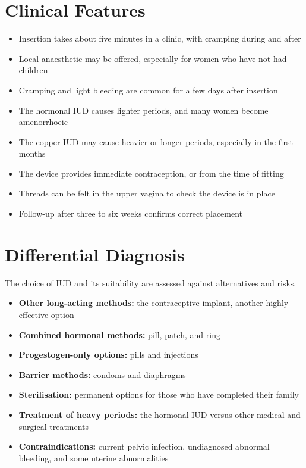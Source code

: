 \section*{Clinical Features}
\begin{itemize}
    \item Insertion takes about five minutes in a clinic, with cramping during and after
    \item Local anaesthetic may be offered, especially for women who have not had children
    \item Cramping and light bleeding are common for a few days after insertion
    \item The hormonal IUD causes lighter periods, and many women become amenorrhoeic
    \item The copper IUD may cause heavier or longer periods, especially in the first months
    \item The device provides immediate contraception, or from the time of fitting
    \item Threads can be felt in the upper vagina to check the device is in place
    \item Follow-up after three to six weeks confirms correct placement
\end{itemize}

\section*{Differential Diagnosis}
The choice of IUD and its suitability are assessed against alternatives and risks.
\begin{itemize}
    \item \textbf{Other long-acting methods:} the contraceptive implant, another highly effective option
    \item \textbf{Combined hormonal methods:} pill, patch, and ring
    \item \textbf{Progestogen-only options:} pills and injections
    \item \textbf{Barrier methods:} condoms and diaphragms
    \item \textbf{Sterilisation:} permanent options for those who have completed their family
    \item \textbf{Treatment of heavy periods:} the hormonal IUD versus other medical and surgical treatments
    \item \textbf{Contraindications:} current pelvic infection, undiagnosed abnormal bleeding, and some uterine abnormalities
\end{itemize}

